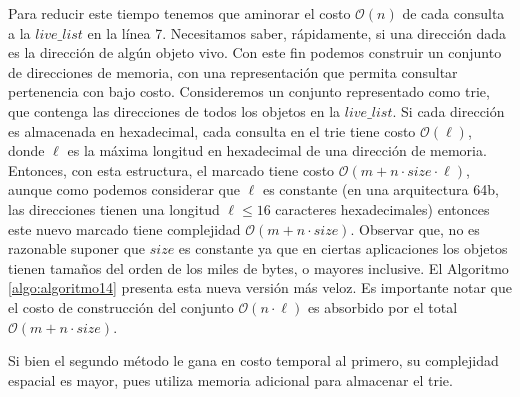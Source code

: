 Para reducir este tiempo tenemos que aminorar el costo $\mathcal{O}(n)$ de cada consulta a la $live\_list$ en la línea 7. Necesitamos saber, rápidamente, si una dirección dada es la dirección de algún objeto vivo. Con este fin podemos construir un conjunto de direcciones de memoria, con una representación que permita consultar pertenencia con bajo costo. Consideremos un conjunto representado como trie, que contenga las direcciones de todos los objetos en la $live\_list$. Si cada dirección es almacenada en hexadecimal, cada consulta en el trie tiene costo $\mathcal{O}(\ell)$, donde $\ell$ es la máxima longitud en hexadecimal de una dirección de memoria. Entonces, con esta estructura, el marcado tiene costo $\mathcal{O}(m + n \cdot size \cdot \ell)$, aunque como podemos considerar que $\ell$ es constante (en una arquitectura 64b, las direcciones tienen una longitud $\ell \leq 16$ caracteres hexadecimales) entonces este nuevo marcado tiene complejidad $\mathcal{O}(m + n \cdot size)$. Observar que, no es razonable suponer que $size$ es constante ya que en ciertas aplicaciones los objetos tienen tamaños del orden de los miles de bytes, o mayores inclusive. El Algoritmo \ref{algo:algoritmo14} presenta esta nueva versión más veloz. Es importante notar que el costo de construcción del conjunto  $\mathcal{O}(n \cdot \ell)$ es absorbido por el total $\mathcal{O}(m + n \cdot size)$.

Si bien el segundo método le gana en costo temporal al primero, su complejidad espacial es mayor, pues utiliza memoria adicional para almacenar el trie.

\begin{algorithm}
	\DontPrintSemicolon
	\Input{-}
	\Output{-}
 	\BlankLine
\caption{$\textsc{Mark-Sweep}$}
\label{algo:algoritmo13}
\end{algorithm}

\begin{algorithm}
	\DontPrintSemicolon
	\Output{-}
 	\BlankLine
\caption{$\textsc{Mark}$}
\label{algo:algoritmo14}
\end{algorithm}

